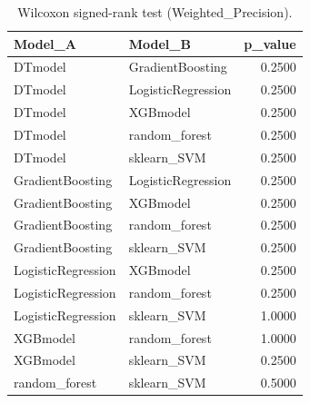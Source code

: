 \begin{table}[t]
\centering
\begin{tabular}{llr}
\toprule
Model_A & Model_B & p_value \\
\midrule
DTmodel & GradientBoosting & 0.2500 \\
DTmodel & LogisticRegression & 0.2500 \\
DTmodel & XGBmodel & 0.2500 \\
DTmodel & random_forest & 0.2500 \\
DTmodel & sklearn_SVM & 0.2500 \\
GradientBoosting & LogisticRegression & 0.2500 \\
GradientBoosting & XGBmodel & 0.2500 \\
GradientBoosting & random_forest & 0.2500 \\
GradientBoosting & sklearn_SVM & 0.2500 \\
LogisticRegression & XGBmodel & 0.2500 \\
LogisticRegression & random_forest & 0.2500 \\
LogisticRegression & sklearn_SVM & 1.0000 \\
XGBmodel & random_forest & 1.0000 \\
XGBmodel & sklearn_SVM & 0.2500 \\
random_forest & sklearn_SVM & 0.5000 \\
\bottomrule
\end{tabular}
\caption{Wilcoxon signed-rank test (Weighted_Precision).}
\label{tab:wilcoxon_Weighted_Precision}
\end{table}